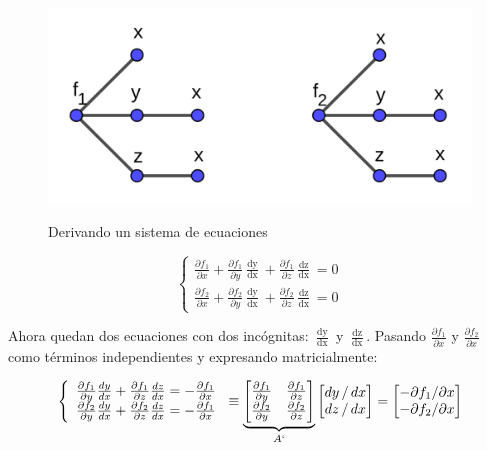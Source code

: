 \documentclass{article}
\begin{document}
\begin{figure}[ht]
\caption{Derivando un sistema de ecuaciones}
\includegraphics[scale=1]{img/tfi/cauchy_dini.png} 
\centering
\label{fig:tcd}
\end{figure}

\begin{equation}
\left\{
\begin{array}{ll}
\frac{\partial f_1}{\partial x} + \frac{\partial f_1}{\partial y} \frac{\mathop{dy}}{\mathop{dx}} + \frac{\partial f_1}{\partial z} \frac{\mathop{dz}}{\mathop{dx}} = 0 \\
\frac{\partial f_2}{\partial x} + \frac{\partial f_2}{\partial y} \frac{\mathop{dy}}{\mathop{dx}} + \frac{\partial f_2}{\partial z} \frac{\mathop{dz}}{\mathop{dx}} = 0
\end{array}
\right.
\end{equation}

Ahora quedan dos ecuaciones con dos incógnitas: $\frac{\mathop{dy}}{\mathop{dx}}$ y $\frac{\mathop{dz}}{\mathop{dx}}$. Pasando $\frac{\partial f_1}{\partial x}$ y $\frac{\partial f_2}{\partial x}$ como términos independientes y expresando matricialmente:

\begin{equation}
\left\{
\begin{array}{ll}
\frac{\partial f_1}{\partial y} \frac{\mathop{dy}}{\mathop{dx}} + \frac{\partial f_1}{\partial z} \frac{\mathop{dz}}{\mathop{dx}} = -\frac{\partial f_1}{\partial x} \\
\frac{\partial f_2}{\partial y} \frac{\mathop{dy}}{\mathop{dx}} + \frac{\partial f_2}{\partial z} \frac{\mathop{dz}}{\mathop{dx}} = -\frac{\partial f_1}{\partial x}
\end{array}
\right. \equiv 
\underbrace{
\begin{bmatrix}
\frac{\partial f_1}{\partial y} & \frac{\partial f_1}{\partial z} \\
\frac{\partial f_2}{\partial y} & \frac{\partial f_2}{\partial z}
\end{bmatrix}
}_{A`}
\begin{bmatrix}
\mathop{dy}/\mathop{dx} \\
\mathop{dz}/\mathop{dx}
\end{bmatrix} = 
\begin{bmatrix}
-\partial f_1/ \partial x \\
-\partial f_2/ \partial x
\end{bmatrix}
\end{equation}
\end{document}
